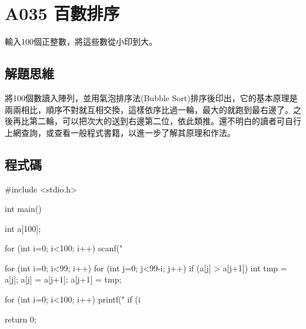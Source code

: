 \section{A035 百數排序}
輸入100個正整數，將這些數從小印到大。
\subsection{解題思維}
將100個數讀入陣列，並用氣泡排序法(Bubble Sort)排序後印出，它的基本原理是兩兩相比，順序不對就互相交換，這樣依序比過一輪，最大的就跑到最右邊了。之後再比第二輪，可以把次大的送到右邊第二位，依此類推。還不明白的讀者可自行上網查詢，或查看一般程式書籍，以進一步了解其原理和作法。

\subsection{程式碼}
\begin{cppcode}
	#include <stdio.h>
	
	int main()
	{
		int a[100];
		
		for (int i=0; i<100; i++) scanf("%
		
		for (int i=0; i<99; i++) {
			for (int j=0; j<99-i; j++) {
				if (a[j] > a[j+1]) {
					int tmp = a[j];
					a[j] = a[j+1];
					a[j+1] = tmp;
				}
			}
		}
		
		for (int i=0; i<100; i++) {
			printf(" %
			if (i%
		}
		
		return 0;
	}
\end{cppcode}
